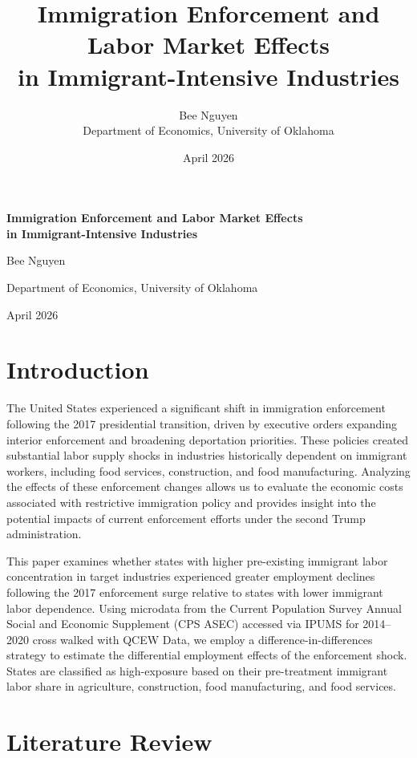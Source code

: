 \documentclass[12pt]{article}
\title{Immigration Enforcement and Labor Market Effects\\
       in Immigrant-Intensive Industries}
\author{Bee Nguyen\\
        \small Department of Economics, University of Oklahoma}
\date{April 2026}
\begin{document}
 
\begin{titlepage}
    \centering
    \vspace*{3cm}
    {\LARGE\bfseries Immigration Enforcement and Labor Market Effects\\[0.3cm]
    in Immigrant-Intensive Industries\par}
    \vspace{1.5cm}
    {\large Bee Nguyen\par}
    {\normalsize Department of Economics, University of Oklahoma\par}
    \vspace{1cm}
    {\large April 2026\par}
    \vspace{2cm}

\end{titlepage}
\newpage
 

\section{Introduction}

 
The United States experienced a significant shift in immigration enforcement following the 2017 presidential transition, driven by executive orders expanding interior enforcement and broadening deportation priorities. These policies created substantial labor supply shocks in industries historically dependent on immigrant workers, including food services, construction, and food manufacturing. Analyzing the effects of these enforcement changes allows us to evaluate the economic costs associated with restrictive immigration policy and provides insight into the potential impacts of current enforcement efforts under the second Trump administration.

This paper examines whether states with higher pre-existing immigrant labor concentration in target industries experienced greater employment declines following the 2017 enforcement surge relative to states with lower immigrant labor dependence. Using microdata from the Current Population Survey Annual Social and Economic Supplement (CPS ASEC) accessed via IPUMS for 2014–2020 cross walked with QCEW Data, we employ a difference-in-differences strategy to estimate the differential employment effects of the enforcement shock. States are classified as high-exposure based on their pre-treatment immigrant labor share in agriculture, construction, food manufacturing, and food services.
 
\section{Literature Review}
\end{document}
